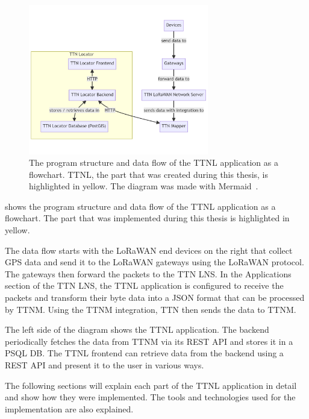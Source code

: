 \begin{figure}[htbp]
    \centering
    \includegraphics[width=0.7\textwidth]{pictures/ttn-locator/program_structure.png}
    \caption{
        The program structure and data flow of the \ac{TTNL} application as a flowchart.
        \ac{TTNL}, the part that was created during this thesis, is highlighted in yellow.
        The diagram was made with Mermaid~\cite{mermaid_mermaid_2023}.
    }\label{pic:program-structure}
\end{figure}

 shows the program structure and data flow of the \ac{TTNL} application as a flowchart.
The part that was implemented during this thesis is highlighted in yellow.

The data flow starts with the \ac{LoRaWAN} end devices on the right that collect \ac{GPS} data and send it to the \ac{LoRaWAN} gateways using the \ac{LoRaWAN} protocol.
The gateways then forward the packets to the \ac{TTN} \ac{LNS}.
In the Applications section of the \ac{TTN} \ac{LNS}, the \ac{TTNL} application is configured to receive the packets and transform their byte data into a \ac{JSON} format that can be processed by \ac{TTNM}.
Using the \ac{TTNM} integration, \ac{TTN} then sends the data to \ac{TTNM}.

The left side of the diagram shows the \ac{TTNL} application.
The backend periodically fetches the data from \ac{TTNM} via its \ac{REST} \ac{API} and stores it in a \ac{PSQL} \ac{DB}.
The \ac{TTNL} frontend can retrieve data from the backend using a \ac{REST} \ac{API} and present it to the user in various ways.

The following sections will explain each part of the \ac{TTNL} application in detail and show how they were implemented.
The tools and technologies used for the implementation are also explained.


